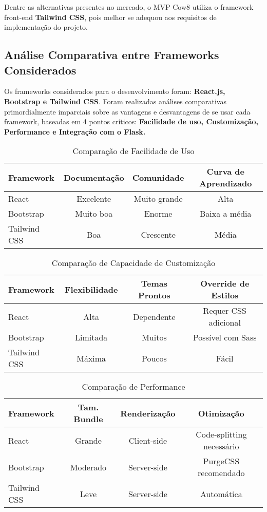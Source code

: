 \documentclass[11pt]{article}
\begin{document}
Dentre as alternativas presentes no mercado, o MVP Cow8 utiliza o framework front-end \textbf{Tailwind CSS}, pois melhor se adequou aos requisitos de implementação do projeto.

\subsection{Análise Comparativa entre Frameworks Considerados}

Os frameworks considerados para o desenvolvimento foram: \textbf{React.js, Bootstrap e Tailwind CSS}. Foram realizadas análises comparativas primordialmente imparciais sobre as vantagens e desvantagens de se usar cada framework, baseadas em 4 pontos críticos: \textbf{Facilidade de uso, Customização, Performance e Integração com o Flask.}

\begin{table}[H]
\centering
\caption{Comparação de Facilidade de Uso}
\begin{tabular}{lccc}
\toprule
\textbf{Framework} & \textbf{Documentação} & \textbf{Comunidade} & \textbf{Curva de Aprendizado} \\
\midrule
React & Excelente & Muito grande & Alta \\
Bootstrap & Muito boa & Enorme & Baixa a média \\
Tailwind CSS & Boa & Crescente & Média \\
\bottomrule
\end{tabular}
\end{table}

\begin{table}[H]
\centering
\caption{Comparação de Capacidade de Customização}
\begin{tabular}{lccc}
\toprule
\textbf{Framework} & \textbf{Flexibilidade} & \textbf{Temas Prontos} & \textbf{Override de Estilos} \\
\midrule
React & Alta & Dependente & Requer CSS adicional \\
Bootstrap & Limitada & Muitos & Possível com Sass \\
Tailwind CSS & Máxima & Poucos & Fácil \\
\bottomrule
\end{tabular}
\end{table}

\begin{table}[H]
\centering
\caption{Comparação de Performance}
\begin{tabular}{lccc}
\toprule
\textbf{Framework} & \textbf{Tam. Bundle} & \textbf{Renderização} & \textbf{Otimização} \\
\midrule
React & Grande & Client-side & Code-splitting necessário \\
Bootstrap & Moderado & Server-side & PurgeCSS recomendado \\
Tailwind CSS & Leve & Server-side & Automática \\
\bottomrule
\end{tabular}
\end{table}
\end{document}
